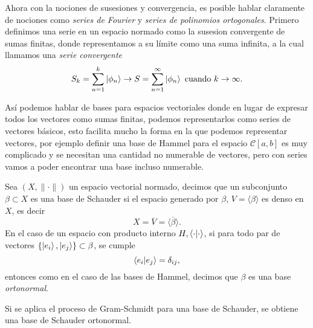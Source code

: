 \documentclass[main.tex]{subfiles}
\begin{document}
Ahora con la nociones de susesiones y convergencia, es posible hablar claramente de nociones como \emph{series de Fourier} y \emph{series de polinomios ortogonales}. Primero definimos una serie en un espacio normado como la susesion convergente de sumas finitas, donde representamos a su límite como una suma infinita, a la cual llamamos una \emph{serie convergente}
\[
    S_k=\sum_{n=1}^k\ket{\phi_n}\rightarrow S=\sum_{n=1}^{\infty}\ket{\phi_n}\text{ cuando }k\rightarrow\infty.
\]

Así podemos hablar de bases para espacios vectoriales donde en lugar de expresar todos los vectores como sumas finitas, podemos representarlos como series de vectores básicos, esto facilita mucho la forma en la que podemos representar vectores, por ejemplo definir una base de Hammel para el espacio \(\mathcal{C}[a,b]\) es muy complicado y se necesitan una cantidad no numerable de vectores, pero con series vamos a poder encontrar una base incluso numerable.

\begin{def.}
  Sea \((X,\|\cdot\|)\) un espacio vectorial normado, decimos que un subconjunto \(\beta\subset X\) es una base de Schauder si el espacio generado por \(\beta\), \(V=\langle\beta\rangle\) es denso en \(X\), es decir
  \[
    X=\overline{V}=\overline{\langle\beta\rangle}.
  \]
  En el caso de un espacio con producto interno \(H,\braket{\cdot|\cdot}\), si para todo par de vectores \(\{\ket{e_i},\ket{e_j}\}\subset\beta\), se cumple
  \[
    \braket{e_i|e_j}=\delta_{ij},
  \]
  entonces como en el caso de las bases de Hammel, decimos que \(\beta\) es una base \emph{ortonormal}.
  \end{def.}
\obs Si se aplica el proceso de Gram-Schmidt para una base de Schauder, se obtiene una base de Schauder ortonormal.\\
\end{document}

